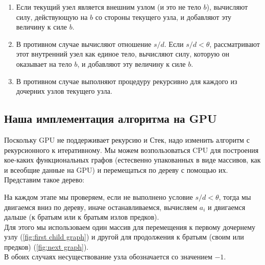 \documentclass{article}
\begin{document}
\begin{enumerate}[label=\Alph*)]
\item Если текущий узел является внешним узлом (и это не тело $b$), вычисляют силу, действующую на $b$ со стороны текущего узла, и добавляют эту величину к силе $b$.
\item В противном случае вычисляют отношение $s/d$. Если $s/d < \theta$, рассматривают этот внутренний узел как единое тело, вычисляют силу, которую он оказывает на тело $b$, и добавляют эту величину к силе $b$.
\item В противном случае выполняют процедуру рекурсивно для каждого из дочерних узлов текущего узла.
\end{enumerate}

\subsection{Наша имплементация алгоритма на GPU}
Поскольку GPU не поддерживает рекурсию и Стек, надо изменить алгоритм с рекурсионного к итеративному.
Мы можем возпользоваться CPU для построения кое-каких функциональных графов (естесвенно упакованных в виде массивов, как и всеобщие данные на GPU) и перемещаться по дереву с помощью их.
Представим такое дерево:
\begin{figure}[H]
  \centering
\end{figure}
На каждом этапе мы проверяем, если не выполнено условие $s/d < \theta$, тогда мы двигаемся вниз по дереву, иначе останавливаемся, вычисляем $a_i$ и двигаемся дальше (к братьям или к братьям излов предков).\\
Для этого мы использоваем один массив для перемещения к первому дочернему узлу (\ref{fig:first child graph}) и другой для продолжения к братьям (своим или предков) (\ref{fig:next graph}).\\
В обоих случаях несуществование узла обозначается со значением $-1$.
\end{document}
